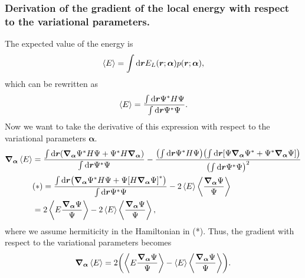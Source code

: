 \subsubsection*{Derivation of the gradient of the local energy with respect to the variational parameters.}

The expected value of the energy is 
\begin{equation}
    \expval{E} = \int\mathrm{d}\bm{r}E_L(\bm{r};\bm{\alpha})p(\bm{r};\bm{\alpha}),
\end{equation}
which can be rewritten as 
\begin{equation}
    \expval{E} = \frac{\int\mathrm{d}\bm{r}\Psi^*H\Psi}{\int\mathrm{d}\bm{r}\Psi^*\Psi}.
\end{equation}
Now we want to take the derivative of this expression with respect to the variational parameters $\bm{\alpha}$. 
\begin{align*}
    \grad_{\bm{\alpha}}\expval{E} &= \frac{\int\mathrm{d}\bm{r}\qty(\grad_{\bm{\alpha}}\Psi^*H\Psi + \Psi^*H\grad_{\bm{\alpha}})}{\int\mathrm{d}\bm{r}\Psi^*\Psi} - \frac{\qty(\int\mathrm{d}\bm{r}\Psi^*H\Psi)\qty(\int\mathrm{d}\bm{r}\qty[\Psi\grad_{\bm{\alpha}}\Psi^* + \Psi^*\grad_{\bm{\alpha}}\Psi])}{\qty(\int\mathrm{d}\bm{r}\Psi^*\Psi)^2} \\
    &(*)= \frac{\int\mathrm{d}\bm{r}\qty(\grad_{\bm{\alpha}}\Psi^*H\Psi + \Psi\qty[H\grad_{\bm{\alpha}}\Psi]^*)}{\int\mathrm{d}\bm{r}\Psi^*\Psi} - 2\expval{E}\expval{\frac{\grad_{\bm{\alpha}}\Psi}{\Psi}} \\
    &= 2\expval{E\frac{\grad_{\bm{\alpha}}\Psi}{\Psi}} - 2\expval{E}\expval{\frac{\grad_{\bm{\alpha}}\Psi}{\Psi}},
\end{align*}
where we assume hermiticity in the Hamiltonian in (*). Thus, the gradient with respect to the variational parameters becomes 
\begin{equation}
    \grad_{\bm{\alpha}}\expval{E} = 2\qty(\expval{E\frac{\grad_{\bm{\alpha}}\Psi}{\Psi}}-\expval{E}\expval{\frac{\grad_{\bm{\alpha}}\Psi}{\Psi}}).
\end{equation}